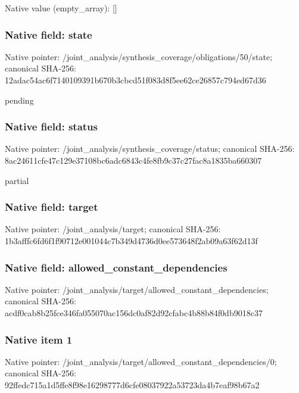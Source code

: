 \documentclass[10pt,a4paper]{article}
\begin{document}
Native value (empty\_\allowbreak{}array): []

\subsubsection{Native field: state}
Native pointer: /joint\_\allowbreak{}analysis/synthesis\_\allowbreak{}coverage/obligations/50/state; canonical SHA-256: 12adac54ac6f7140109391b670b3cbcd51f083d8f5ee62ce26857c794ed67d36

\begingroup\raggedright\sloppy pending\par\endgroup

\subsubsection{Native field: status}
Native pointer: /joint\_\allowbreak{}analysis/synthesis\_\allowbreak{}coverage/status; canonical SHA-256: 8ac24611cfe47c129e37108bc6adc6843c4fe8fb9c37c27fac8a1835ba660307

\begingroup\raggedright\sloppy partial\par\endgroup

\subsubsection{Native field: target}
Native pointer: /joint\_\allowbreak{}analysis/target; canonical SHA-256: 1b3afffc6fd6f1f90712e001044c7b349d4736d0ee573648f2ab09a63f62d13f

\subsubsection{Native field: allowed\_\allowbreak{}constant\_\allowbreak{}dependencies}
Native pointer: /joint\_\allowbreak{}analysis/target/allowed\_\allowbreak{}constant\_\allowbreak{}dependencies; canonical SHA-256: acdf0cab8b25fce346fa055070ac156dc0af82d92cfabc4b88b84f0db9018c37

\subsubsection{Native item 1}
Native pointer: /joint\_\allowbreak{}analysis/target/allowed\_\allowbreak{}constant\_\allowbreak{}dependencies/0; canonical SHA-256: 92ffedc715a1d5ffe8f98e16298777d6cfe08037922a53723da4b7eaf98b67a2
\end{document}
